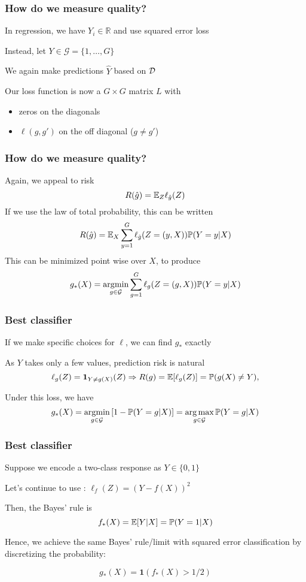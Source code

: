 \documentclass[12pt]{beamer}
\begin{document}
\begin{frame}
\frametitle{How do we measure quality?}
In regression, we have $Y_i \in \mathbb{R}$ and use squared error loss

\vsp
Instead, let $Y \in \mathcal{G} = \{1,\ldots, G\}$ 


\vsp
We again make predictions $\hat{Y}$ based on $\mathcal{D}$

\vsp
Our loss function is now a $G\times G$ matrix $L$ with

\begin{itemize}
\item zeros on the diagonals
\item $\ell(g,g')$ on the off diagonal ($g\neq g'$)
\end{itemize}
\end{frame}

\begin{frame}
\frametitle{How do we measure quality?}
Again, we appeal to risk
\[
R(\hat{g}) = \mathbb{E}_{Z} \ell_{\hat{g}}(Z)
\]
If we use the law of total probability, this can be written
\[
R(\hat{g}) = \mathbb{E}_X \sum_{y=1}^G \ell_{\hat{g}}(Z = (y,X)) \mathbb{P}(Y = y | X)
\]
This can be minimized point wise over $X$, to produce
\[
g_*(X) = \operatorname*{\arg\!\min}_{g \in \mathcal{G}} \sum_{g=1}^G \ell_g(Z = (g,X)) \mathbb{P}(Y = y | X)
\]
\end{frame}

\begin{frame}
\frametitle{Best classifier}
 If we make specific choices for $\ell$, we can find $g_*$ exactly

\vsp
As $Y$ takes only a few values,  prediction risk is natural
  \[
  \ell_g(Z) = \mathbf{1}_{Y\neq g(X)}(Z) \Rightarrow R(g) = \mathbb{E}[\ell_g(Z)] = \mathbb{P}(g(X) \neq Y),
  \]


\vsp
Under this loss, we have
\[
g_*(X) = \operatorname*{\arg\!\min}_{g \in \mathcal{G}} \left[ 1 - \mathbb{P}(Y = g | X)\right]  = \operatorname*{arg\,max}_{g \in \mathcal{G}} \mathbb{P}(Y = g | X )
\]


\end{frame}

\begin{frame}
\frametitle{Best classifier}
Suppose we encode a two-class response as $Y \in \{0,1\}$

\vsp
Let's continue to use : $\ell_f(Z) = (Y - f(X))^2$

\vsp
Then, the Bayes' rule is 
\[
f_*(X) = \mathbb{E}[ Y | X] = \mathbb{P}(Y = 1 | X)
\]
\vsp

Hence, we achieve the same Bayes' rule/limit with squared error classification
by discretizing the probability:

\[
g_*(X) = \mathbf{1}(f_*(X) > 1/2)
\]
\end{frame}
\end{document}
